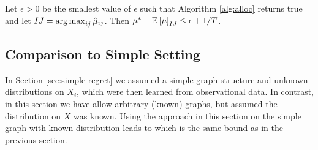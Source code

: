 \begin{theorem}
Let $\epsilon > 0$ be the smallest value of $\epsilon$ such that Algorithm \ref{alg:alloc} returns true and let $IJ = \argmax_{ij} \hat \mu_{ij}$.
Then $\mu^* - \mathbb E\left[\mu\right]_{IJ} \leq \epsilon + 1/T$.
\end{theorem}


\subsection*{Comparison to Simple Setting}

In Section \ref{sec:simple-regret} we assumed a simple graph structure and unknown distributions on $X_i$, which were then learned from observational
data. In contrast, in this section we have allow arbitrary (known) graphs, but assumed the distribution on $X$ was known. 
Using the approach in this section on the simple graph with known distribution leads to 
which is the same bound as in the previous section. 





